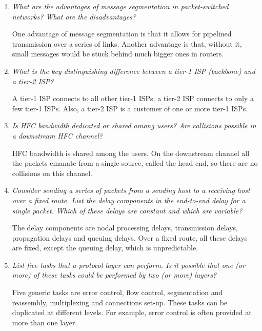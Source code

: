 \begin{enumerate}
\begin{itemize}
     \item the need to maintain connection state in the packet
       switches.

   \end{itemize}
   The main advantage of VC networks is that they allow to guarantee
   an end-to-end delay.

  \item \emph{What are the advantages of message segmentation in
    packet-switched networks? What are the disadvantages?}

  One advantage of message segmentation is that it allows for
  pipelined transmission over a series of links. Another advantage is
  that, without it, small messages would be stuck behind much bigger
  ones in routers.

  \item \emph{What is the key distinguishing difference between a
    tier-1 ISP (backbone) and a tier-2 ISP?}

  A tier-1 ISP connects to all other tier-1 ISPs; a tier-2 ISP
  connects to only a few tier-1 ISPs. Also, a tier-2 ISP is a customer
  of one or more tier-1 ISPs.

  \item \emph{Is HFC bandwidth dedicated or shared among users? Are
    collisions possible in a downstream HFC channel?}

  HFC bandwidth is shared among the users. On the downstream channel
  all the packets emanate from a single source, called the head end,
  so there are no collisions on this channel.

  \item \emph{Consider sending a series of packets from a sending host
    to a receiving host over a fixed route. List the delay components
    in the end-to-end delay for a single packet. Which of these delays
    are constant and which are variable?}

  The delay components are nodal processing delays, transmission
  delays, propagation delays and queuing delays. Over a fixed route,
  all these delays are fixed, except the queuing delay, which is
  unpredictable.

  \item \emph{List five tasks that a protocol layer can perform. Is it
    possible that one (or more) of these tasks could be performed by
    two (or more) layers?}

  Five generic tasks are error control, flow control, segmentation and
  reassembly, multiplexing and connections set-up. These tasks can be
  duplicated at different levels. For example, error control is often
  provided at more than one layer.


\end{enumerate}
